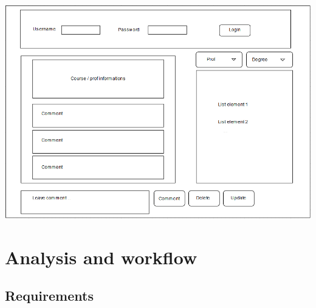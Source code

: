 \documentclass[a4paper, oneside]{article}
\begin{document}
\begin{minipage}{\linewidth}
\begin{center}
\vspace{8mm}
\includegraphics[width=\textwidth]{./images/diagrams/Mockup.pdf} 
\vspace{3mm}
\label{fig:mockup}
\end{center}
\end{minipage}

\clearpage

\section{Analysis and workflow}

\subsection{Requirements}
\end{document}
